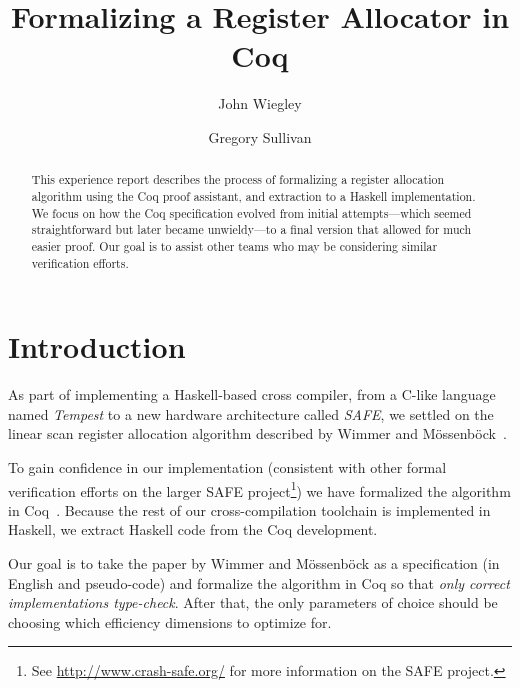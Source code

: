 \documentclass{llncs}
\begin{document}
\frontmatter          %

\pagestyle{headings}  %

\mainmatter

\title{Formalizing a Register Allocator in Coq}

\author{John Wiegley \and Gregory Sullivan}


\maketitle

\begin{abstract}
  This experience report describes the process of formalizing a register
  allocation algorithm using the Coq proof assistant, and extraction to a
  Haskell implementation.  We focus on how the Coq specification evolved from
  initial attempts---which seemed straightforward but later became
  unwieldy---to a final version that allowed for much easier proof.  Our goal
  is to assist other teams who may be considering similar verification
  efforts.
  
\end{abstract}

\section{Introduction}
\label{sec:intro}

As part of implementing a Haskell-based cross compiler, from a C-like language
named \emph{Tempest} to a new hardware architecture called \emph{SAFE}, we
settled on the linear scan register allocation algorithm described by Wimmer
and M\"{o}ssenb\"{o}ck~\cite{Wimmer:2005}.

To gain confidence in our implementation (consistent with other formal
verification efforts on the larger SAFE project\footnote{See
  \url{http://www.crash-safe.org/} for more information on the SAFE project.})
we have formalized the algorithm in Coq~\cite{coq_manual}. Because the rest of
our cross-compilation toolchain is implemented in Haskell, we extract Haskell
code from the Coq development.

Our goal is to take the paper by Wimmer and M\"{o}ssenb\"{o}ck as a
specification (in English and pseudo-code) and formalize the algorithm in Coq
so that \emph{only correct implementations type-check}.  After that, the only
parameters of choice should be choosing which efficiency dimensions to
optimize for.
\end{document}
